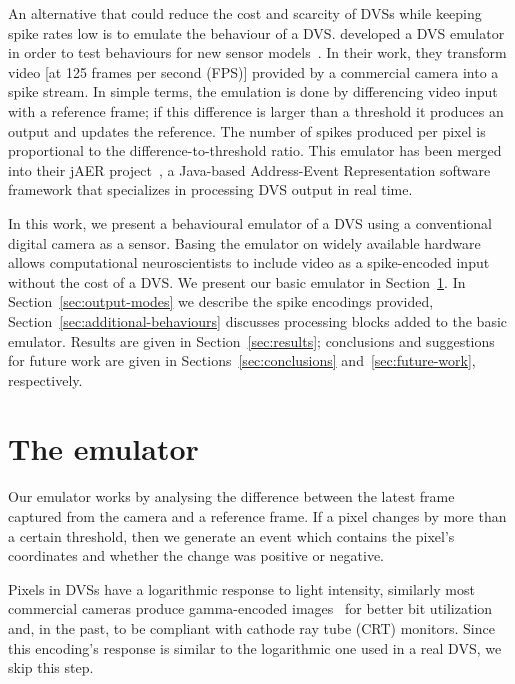 \documentclass[conference]{IEEEtran}
\begin{document}
An alternative that could reduce the cost and scarcity of DVSs while keeping spike rates low is to emulate the behaviour of a DVS. \citeauthor{DVSemu} developed a DVS emulator in order to test behaviours for new sensor models~\cite{DVSemu}. In their work, they transform video [at 125 frames per second (FPS)] provided by a commercial camera into a spike stream. In simple terms, the emulation is done by differencing video input with a reference frame; if this difference is larger than a threshold it produces an output and updates the reference. The number of spikes produced per pixel is proportional to the difference-to-threshold ratio. This emulator has been merged into their jAER project~\cite{delbruck2008frame}, a Java-based Address-Event Representation software framework that specializes in processing DVS output in real time.

In this work, we present a behavioural emulator of a DVS using a conventional digital camera as a sensor. Basing the emulator on widely available hardware allows computational neuroscientists to include video as a spike-encoded input without the cost of a DVS. We present our basic emulator in Section~\ref{sec:basic-emulator}. In Section~\ref{sec:output-modes} we describe the spike encodings provided, Section~\ref{sec:additional-behaviours} discusses processing blocks added to the basic emulator. Results are given in Section~\ref{sec:results}; conclusions and suggestions for future work are given in Sections~\ref{sec:conclusions} and~\ref{sec:future-work}, respectively.


\section{The emulator}
\label{sec:basic-emulator}

Our emulator works by analysing the difference between the latest frame captured from the camera and a reference frame. If a pixel changes by more than a certain threshold, then we generate an event which contains the pixel's coordinates and whether the change was positive or negative. 

Pixels in DVSs have a logarithmic response to light intensity, similarly most commercial cameras produce gamma-encoded images~\cite{PoyntonDigitalVideo} for better bit utilization and, in the past, to be compliant with cathode ray tube (CRT) monitors.
Since this encoding's response is similar to the logarithmic one used in a real DVS, we skip this step.
\end{document}
